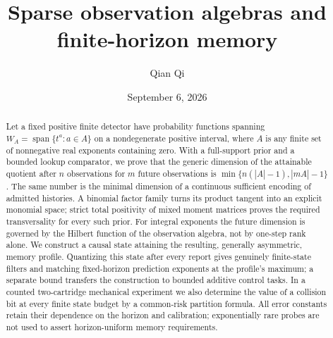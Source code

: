 \documentclass[11pt]{amsart}
\title[Sparse observation algebras and memory]{Sparse observation algebras and finite-horizon memory}
\author{Qian Qi}
\date{September 6, 2026}
\theoremstyle{definition}\newtheorem{definition}[theorem]{Definition}
\theoremstyle{remark}\newtheorem{remark}[theorem]{Remark}
\DeclareMathOperator{\spanop}{span}\DeclareMathOperator{\rank}{rank}
\begin{document}
\begin{abstract}
Let a fixed positive finite detector have probability functions spanning
$W_A=\spanop\{t^a:a\in A\}$ on a nondegenerate positive interval, where
$A$ is any finite set of nonnegative real exponents containing zero.
With a full-support prior and a bounded lookup comparator, we prove that
the generic dimension of the attainable quotient after $n$ observations
for $m$ future observations is
$\min\{n(|A|-1),|mA|-1\}$.
The same number is the minimal dimension of a continuous sufficient
encoding of admitted histories. A binomial factor family turns its product
tangent into an explicit monomial space; strict total positivity of mixed
moment matrices proves the required transversality for every such prior.
For integral exponents the future dimension is governed by the Hilbert
function of the observation algebra, not by one-step rank alone.
We construct a causal state attaining the resulting, generally asymmetric,
memory profile. Quantizing this state after every report gives genuinely
finite-state filters and matching fixed-horizon prediction exponents at
the profile's maximum; a separate bound transfers the construction to
bounded additive control tasks. In a counted two-cartridge mechanical
experiment we also determine the value of a collision bit at every finite
state budget by a common-risk partition formula. All error constants retain
their dependence on the horizon and calibration; exponentially rare probes
are not used to assert horizon-uniform memory requirements.
\end{abstract}
\maketitle








\end{document}
